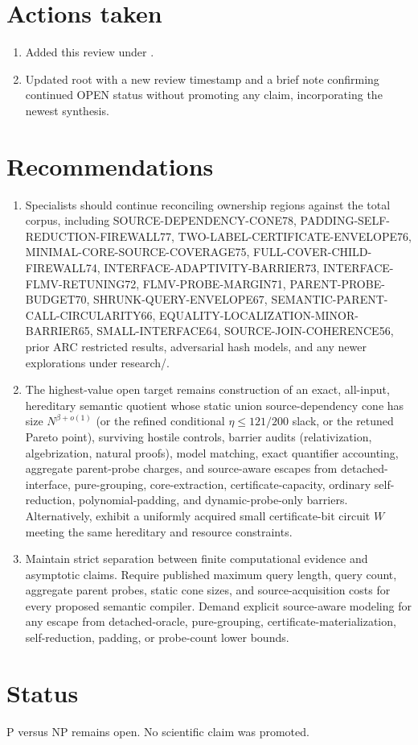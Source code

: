 \documentclass[11pt]{article}
\begin{document}
\section{Actions taken}
\begin{enumerate}
\item Added this review under .
\item Updated root  with a new review timestamp and a brief note confirming continued OPEN status without promoting any claim, incorporating the newest synthesis.
\end{enumerate}

\section{Recommendations}
\begin{enumerate}
\item Specialists should continue reconciling ownership regions against the total corpus, including SOURCE-DEPENDENCY-CONE78, PADDING-SELF-REDUCTION-FIREWALL77, TWO-LABEL-CERTIFICATE-ENVELOPE76, MINIMAL-CORE-SOURCE-COVERAGE75, FULL-COVER-CHILD-FIREWALL74, INTERFACE-ADAPTIVITY-BARRIER73, INTERFACE-FLMV-RETUNING72, FLMV-PROBE-MARGIN71, PARENT-PROBE-BUDGET70, SHRUNK-QUERY-ENVELOPE67, SEMANTIC-PARENT-CALL-CIRCULARITY66, EQUALITY-LOCALIZATION-MINOR-BARRIER65, SMALL-INTERFACE64, SOURCE-JOIN-COHERENCE56, prior ARC restricted results, adversarial hash models, and any newer explorations under research/.
\item The highest-value open target remains construction of an exact, all-input, hereditary semantic quotient whose static union source-dependency cone has size $N^{\beta+o(1)}$ (or the refined conditional $\eta\le 121/200$ slack, or the retuned Pareto point), surviving hostile controls, barrier audits (relativization, algebrization, natural proofs), model matching, exact quantifier accounting, aggregate parent-probe charges, and source-aware escapes from detached-interface, pure-grouping, core-extraction, certificate-capacity, ordinary self-reduction, polynomial-padding, and dynamic-probe-only barriers. Alternatively, exhibit a uniformly acquired small certificate-bit circuit $W$ meeting the same hereditary and resource constraints.
\item Maintain strict separation between finite computational evidence and asymptotic claims. Require published maximum query length, query count, aggregate parent probes, static cone sizes, and source-acquisition costs for every proposed semantic compiler. Demand explicit source-aware modeling for any escape from detached-oracle, pure-grouping, certificate-materialization, self-reduction, padding, or probe-count lower bounds.
\end{enumerate}

\section{Status}
P versus NP remains open. No scientific claim was promoted.

\end{document}
